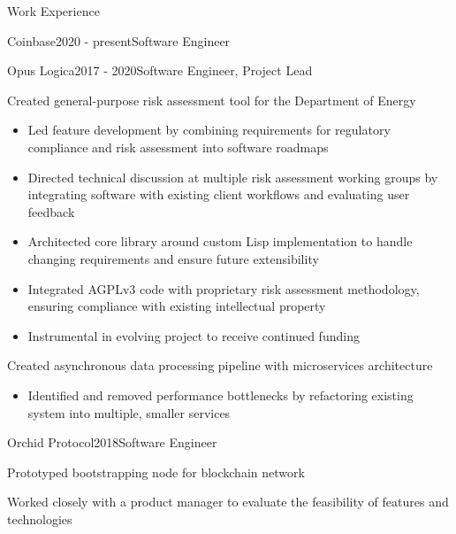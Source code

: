 \documentclass{resume} %
\begin{document}
\begin{rSection}{Work Experience}

  \begin{rSubsection}{Coinbase}{2020 - present}{Software Engineer}{}
  \end{rSubsection}

  \begin{rSubsection}{Opus Logica}{2017 - 2020}{Software Engineer, Project Lead}{}

  \item Created general-purpose risk assessment tool for the Department of Energy
    \begin{itemize}[label=\raisebox{0.4ex}{\tiny $\bullet$}]
      \itemsep -0.5em
      \vspace{-0.5em}
    \item Led feature development by combining requirements for regulatory compliance and risk assessment into software roadmaps
    \item Directed technical discussion at multiple risk assessment working groups by integrating software with existing client workflows and evaluating user feedback
    \item Architected core library around custom Lisp implementation to handle changing requirements and ensure future extensibility
    \item Integrated AGPLv3 code with proprietary risk assessment methodology, ensuring compliance with existing intellectual property
    \item Instrumental in evolving project to receive continued funding
    \end{itemize}
    \hspace{.2667\textwidth}
  \item Created asynchronous data processing pipeline with microservices architecture
    \begin{itemize}[label=\raisebox{0.4ex}{\tiny $\bullet$}]
      \itemsep -0.5em
      \vspace{-0.5em}
    \item Identified and removed performance bottlenecks by refactoring existing system into multiple, smaller services
    \end{itemize}
  \end{rSubsection}

  \begin{rSubsection}{Orchid Protocol}{2018}{Software Engineer}{}
  \item Prototyped bootstrapping node for blockchain network
  \item Worked closely with a product manager to evaluate the feasibility of features and technologies
  \end{rSubsection}


\end{rSection}
\end{document}
